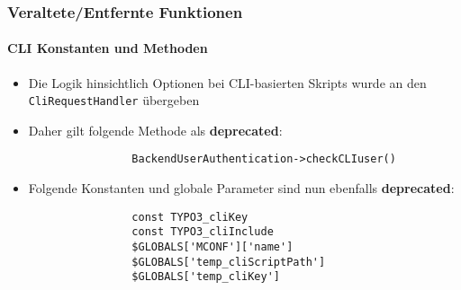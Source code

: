 
\begin{frame}[fragile]
	\frametitle{Veraltete/Entfernte Funktionen}
	\framesubtitle{CLI Konstanten und Methoden}


	\begin{itemize}

		\item Die Logik hinsichtlich Optionen bei CLI-basierten Skripts wurde an den \texttt{CliRequestHandler} übergeben

		\item Daher gilt folgende Methode als \textbf{deprecated}:

			\begin{lstlisting}
				BackendUserAuthentication->checkCLIuser()
			\end{lstlisting}

		\item Folgende Konstanten und globale Parameter sind nun ebenfalls \textbf{deprecated}:

			\begin{lstlisting}
				const TYPO3_cliKey
				const TYPO3_cliInclude
				$GLOBALS['MCONF']['name']
				$GLOBALS['temp_cliScriptPath']
				$GLOBALS['temp_cliKey']
			\end{lstlisting}

	\end{itemize}

\end{frame}


